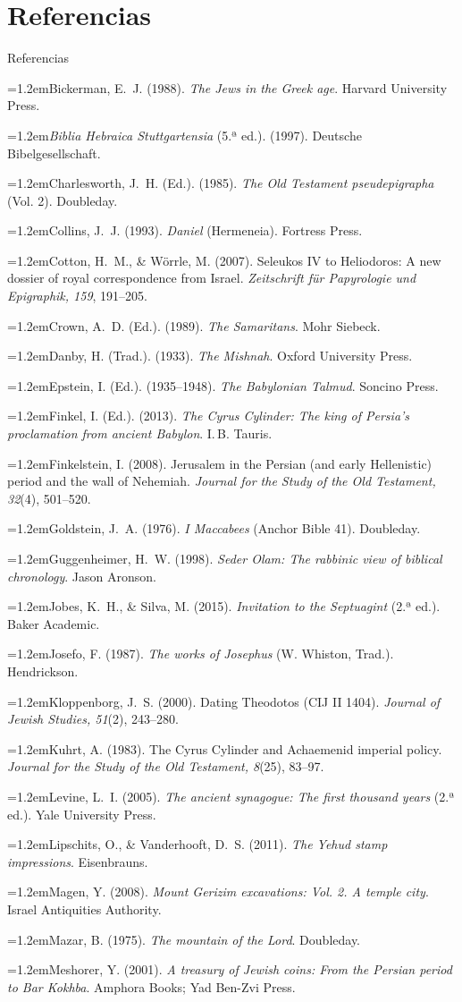 \documentclass[hyperref={bookmarks=false},aspectratio=169]{beamer}
\newcommand{\refapa}[1]{\par\hangindent=1.2em\hangafter=1\noindent #1\par\vspace{3pt}}
\begin{document}
\section{Referencias}
\begin{frame}[allowframebreaks]{Referencias}
\tiny
\refapa{Bickerman, E.~J. (1988). \emph{The Jews in the Greek age}. Harvard University Press.}
\refapa{\emph{Biblia Hebraica Stuttgartensia} (5.ª ed.). (1997). Deutsche Bibelgesellschaft.}
\refapa{Charlesworth, J.~H. (Ed.). (1985). \emph{The Old Testament pseudepigrapha} (Vol. 2). Doubleday.}
\refapa{Collins, J.~J. (1993). \emph{Daniel} (Hermeneia). Fortress Press.}
\refapa{Cotton, H.~M., \& Wörrle, M. (2007). Seleukos IV to Heliodoros: A new dossier of royal correspondence from Israel. \emph{Zeitschrift für Papyrologie und Epigraphik, 159}, 191--205.}
\refapa{Crown, A.~D. (Ed.). (1989). \emph{The Samaritans}. Mohr Siebeck.}
\refapa{Danby, H. (Trad.). (1933). \emph{The Mishnah}. Oxford University Press.}
\refapa{Epstein, I. (Ed.). (1935--1948). \emph{The Babylonian Talmud}. Soncino Press.}
\refapa{Finkel, I. (Ed.). (2013). \emph{The Cyrus Cylinder: The king of Persia's proclamation from ancient Babylon}. I.\,B. Tauris.}
\refapa{Finkelstein, I. (2008). Jerusalem in the Persian (and early Hellenistic) period and the wall of Nehemiah. \emph{Journal for the Study of the Old Testament, 32}(4), 501--520.}
\refapa{Goldstein, J.~A. (1976). \emph{I Maccabees} (Anchor Bible 41). Doubleday.}
\refapa{Guggenheimer, H.~W. (1998). \emph{Seder Olam: The rabbinic view of biblical chronology}. Jason Aronson.}
\refapa{Jobes, K.~H., \& Silva, M. (2015). \emph{Invitation to the Septuagint} (2.ª ed.). Baker Academic.}
\refapa{Josefo, F. (1987). \emph{The works of Josephus} (W. Whiston, Trad.). Hendrickson.}
\refapa{Kloppenborg, J.~S. (2000). Dating Theodotos (CIJ II 1404). \emph{Journal of Jewish Studies, 51}(2), 243--280.}
\refapa{Kuhrt, A. (1983). The Cyrus Cylinder and Achaemenid imperial policy. \emph{Journal for the Study of the Old Testament, 8}(25), 83--97.}
\refapa{Levine, L.~I. (2005). \emph{The ancient synagogue: The first thousand years} (2.ª ed.). Yale University Press.}
\refapa{Lipschits, O., \& Vanderhooft, D.~S. (2011). \emph{The Yehud stamp impressions}. Eisenbrauns.}
\refapa{Magen, Y. (2008). \emph{Mount Gerizim excavations: Vol. 2. A temple city}. Israel Antiquities Authority.}
\refapa{Mazar, B. (1975). \emph{The mountain of the Lord}. Doubleday.}
\refapa{Meshorer, Y. (2001). \emph{A treasury of Jewish coins: From the Persian period to Bar Kokhba}. Amphora Books; Yad Ben-Zvi Press.}

\end{frame}
\end{document}
